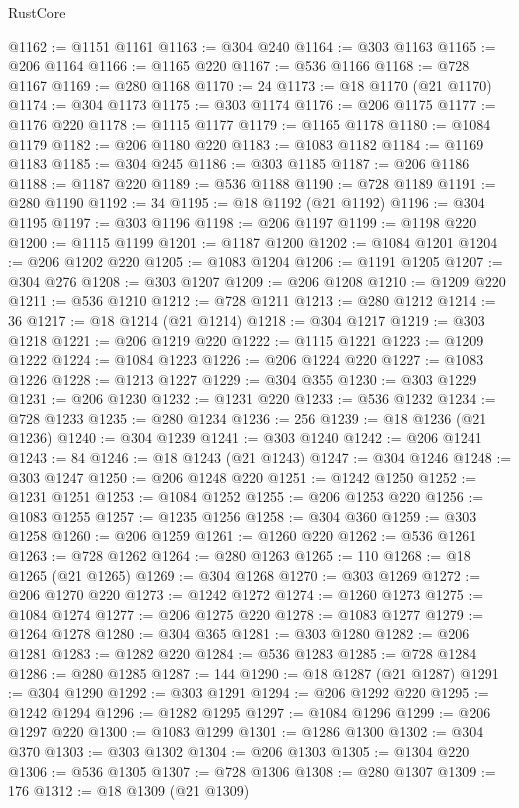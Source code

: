 \begin{lexlean}{RustCore}
\begin{coremodule}
@1162 := @1151 @1161
@1163 := @304 @240
@1164 := @303 @1163
@1165 := @206 @1164
@1166 := @1165 @220
@1167 := @536 @1166
@1168 := @728 @1167
@1169 := @280 @1168
@1170 := 24
@1173 := @18 @1170 (@21 @1170)
@1174 := @304 @1173
@1175 := @303 @1174
@1176 := @206 @1175
@1177 := @1176 @220
@1178 := @1115 @1177
@1179 := @1165 @1178
@1180 := @1084 @1179
@1182 := @206 @1180 @220
@1183 := @1083 @1182
@1184 := @1169 @1183
@1185 := @304 @245
@1186 := @303 @1185
@1187 := @206 @1186
@1188 := @1187 @220
@1189 := @536 @1188
@1190 := @728 @1189
@1191 := @280 @1190
@1192 := 34
@1195 := @18 @1192 (@21 @1192)
@1196 := @304 @1195
@1197 := @303 @1196
@1198 := @206 @1197
@1199 := @1198 @220
@1200 := @1115 @1199
@1201 := @1187 @1200
@1202 := @1084 @1201
@1204 := @206 @1202 @220
@1205 := @1083 @1204
@1206 := @1191 @1205
@1207 := @304 @276
@1208 := @303 @1207
@1209 := @206 @1208
@1210 := @1209 @220
@1211 := @536 @1210
@1212 := @728 @1211
@1213 := @280 @1212
@1214 := 36
@1217 := @18 @1214 (@21 @1214)
@1218 := @304 @1217
@1219 := @303 @1218
@1221 := @206 @1219 @220
@1222 := @1115 @1221
@1223 := @1209 @1222
@1224 := @1084 @1223
@1226 := @206 @1224 @220
@1227 := @1083 @1226
@1228 := @1213 @1227
@1229 := @304 @355
@1230 := @303 @1229
@1231 := @206 @1230
@1232 := @1231 @220
@1233 := @536 @1232
@1234 := @728 @1233
@1235 := @280 @1234
@1236 := 256
@1239 := @18 @1236 (@21 @1236)
@1240 := @304 @1239
@1241 := @303 @1240
@1242 := @206 @1241
@1243 := 84
@1246 := @18 @1243 (@21 @1243)
@1247 := @304 @1246
@1248 := @303 @1247
@1250 := @206 @1248 @220
@1251 := @1242 @1250
@1252 := @1231 @1251
@1253 := @1084 @1252
@1255 := @206 @1253 @220
@1256 := @1083 @1255
@1257 := @1235 @1256
@1258 := @304 @360
@1259 := @303 @1258
@1260 := @206 @1259
@1261 := @1260 @220
@1262 := @536 @1261
@1263 := @728 @1262
@1264 := @280 @1263
@1265 := 110
@1268 := @18 @1265 (@21 @1265)
@1269 := @304 @1268
@1270 := @303 @1269
@1272 := @206 @1270 @220
@1273 := @1242 @1272
@1274 := @1260 @1273
@1275 := @1084 @1274
@1277 := @206 @1275 @220
@1278 := @1083 @1277
@1279 := @1264 @1278
@1280 := @304 @365
@1281 := @303 @1280
@1282 := @206 @1281
@1283 := @1282 @220
@1284 := @536 @1283
@1285 := @728 @1284
@1286 := @280 @1285
@1287 := 144
@1290 := @18 @1287 (@21 @1287)
@1291 := @304 @1290
@1292 := @303 @1291
@1294 := @206 @1292 @220
@1295 := @1242 @1294
@1296 := @1282 @1295
@1297 := @1084 @1296
@1299 := @206 @1297 @220
@1300 := @1083 @1299
@1301 := @1286 @1300
@1302 := @304 @370
@1303 := @303 @1302
@1304 := @206 @1303
@1305 := @1304 @220
@1306 := @536 @1305
@1307 := @728 @1306
@1308 := @280 @1307
@1309 := 176
@1312 := @18 @1309 (@21 @1309)

\end{coremodule}
\end{lexlean}
